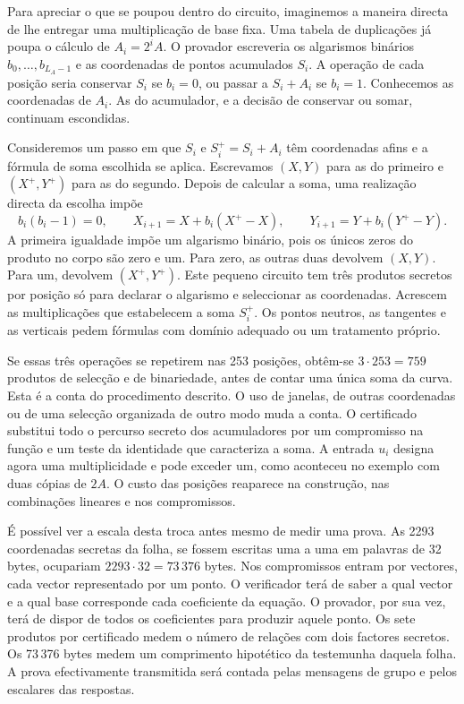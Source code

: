 Para apreciar o que se poupou dentro do circuito, imaginemos a
maneira directa de lhe entregar uma multiplicação de base fixa.
Uma tabela de duplicações já poupa o cálculo de
\(A_i=2^iA\). O provador escreveria os algarismos binários
\(b_0,\ldots,b_{L_A-1}\) e as coordenadas de pontos acumulados
\(S_i\). A operação de cada posição seria conservar \(S_i\) se
\(b_i=0\), ou passar a \(S_i+A_i\) se \(b_i=1\). Conhecemos
as coordenadas de \(A_i\). As do acumulador, e a decisão de
conservar ou somar, continuam escondidas.

Consideremos um passo em que \(S_i\) e
\(S_i^+=S_i+A_i\) têm coordenadas afins e a fórmula de soma
escolhida se aplica. Escrevamos \((X,Y)\) para as do primeiro
e \((X^+,Y^+)\) para as do segundo. Depois de calcular a soma,
uma realização directa da escolha impõe
\[
 b_i(b_i-1)=0,\qquad
 X_{i+1}=X+b_i(X^+-X),\qquad
 Y_{i+1}=Y+b_i(Y^+-Y).
\]
A primeira igualdade impõe um algarismo binário, pois os únicos
zeros do produto no corpo são zero e um. Para zero, as outras
duas devolvem \((X,Y)\). Para um, devolvem \((X^+,Y^+)\).
Este pequeno circuito tem três produtos secretos por posição
só para declarar o algarismo e seleccionar as coordenadas.
Acrescem as multiplicações que estabelecem a soma \(S_i^+\).
Os pontos neutros, as tangentes e as verticais pedem fórmulas
com domínio adequado ou um tratamento próprio.

Se essas três operações se repetirem nas 253 posições,
obtêm-se \(3\cdot253=759\) produtos de selecção e de
binariedade, antes de contar uma única soma da curva.
Esta é a conta do procedimento descrito. O uso de janelas,
de outras coordenadas ou de uma selecção organizada de outro
modo muda a conta. O certificado substitui todo o percurso
secreto dos acumuladores por um compromisso na função e um
teste da identidade que caracteriza a soma. A entrada \(u_i\)
designa agora uma multiplicidade e pode exceder um, como
aconteceu no exemplo com duas cópias de \(2A\). O custo das
posições reaparece na construção, nas combinações lineares e
nos compromissos.

É possível ver a escala desta troca antes mesmo de medir uma
prova. As 2293 coordenadas secretas da folha, se fossem escritas
uma a uma em palavras de 32 bytes, ocupariam
\(2293\cdot32=73\,376\) bytes. Nos compromissos entram por
vectores, cada vector representado por um ponto. O verificador
terá de saber a qual vector e a qual base corresponde cada
coeficiente da equação. O provador, por sua vez, terá de dispor
de todos os coeficientes para produzir aquele ponto. Os sete
produtos por certificado medem o número de relações com dois
factores secretos. Os 73\,376 bytes medem um comprimento
hipotético da testemunha daquela folha. A prova efectivamente
transmitida será contada pelas mensagens de grupo e pelos
escalares das respostas.

